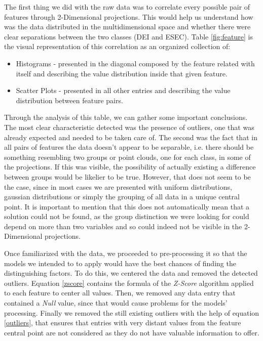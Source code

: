 \documentclass[extendedabs]{recpad2k}
\begin{document}
The first thing we did with the raw data was to correlate every possible pair of features through 2-Dimensional projections.
This would help us understand how was the data distributed in the multidimensional space and whether there were clear separations between the two classes 
(DEI and ESEC).
Table \ref{fig:feature} is the visual representation of this correlation as an organized collection of:
\begin{itemize}[noitemsep,nolistsep]
\item Histograms - presented in the diagonal composed by the feature related with itself and describing the value distribution inside that given feature.
\item Scatter Plots - presented in all other entries and describing the value distribution between feature pairs.
\end{itemize}

Through the analysis of this table, we can gather some important conclusions. 
The most clear characteristic detected was the presence of outliers, one that was already expected and needed to be taken care of.
The second was the fact that in all pairs of features the data doesn't appear to be separable, i.e. there should be something resembling two groups or point clouds,
one for each class, in some of the projections.
If this was visible, the possibility of actually existing a difference between groups would be likelier to be true.
However, that does not seem to be the case, since in most cases we are presented with uniform distributions, gaussian distributions or simply the grouping of 
all data in a unique central point. 
It is important to mention that this does not automatically mean that a solution could not be found, as the group distinction we were looking for could depend 
on more than two variables and so could indeed not be visible in the 2-Dimensional projections.

Once familiarized with the data, we proceeded to pre-processing it so that the models we intended to to apply would have the best chances of finding the 
distinguishing factors.
To do this, we centered the data and removed the detected outliers.
Equation \ref{zscore} contains the formula of the \textit{Z-Score} algorithm applied to each feature to center all values.
Then, we removed any data entry that contained a \textit{Null} value, since that would cause problems for the models' processing.
Finally we removed the still existing outliers with the help of equation \ref{outliers}, that ensures that entries with very distant values from the feature central point are not considered as they do not have valuable information to offer.
\end{document}
